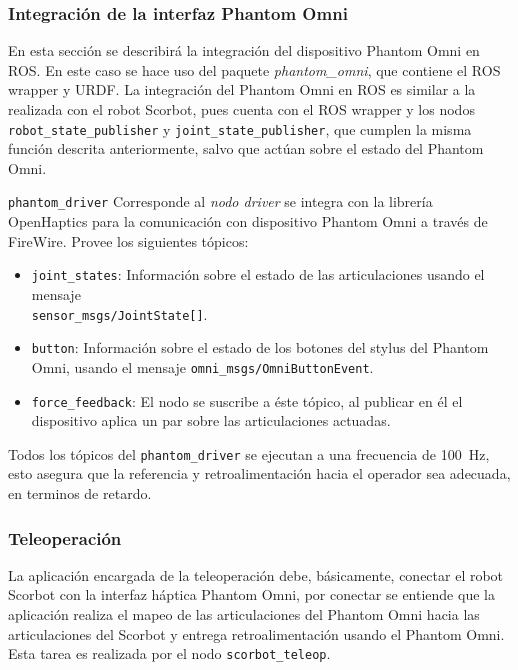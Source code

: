 \subsubsection{Integración de la interfaz Phantom Omni}

En esta sección se describirá la integración del dispositivo Phantom Omni en ROS. En este caso se hace uso del paquete \textit{phantom\_omni}\cite{phantom_git}, que contiene el ROS wrapper y URDF. La integración del Phantom Omni en ROS es similar a la realizada con el robot Scorbot, pues cuenta con el  ROS wrapper y los nodos \texttt{robot\_state\_publisher} y  \texttt{joint\_state\_publisher}, que cumplen la misma función descrita anteriormente, salvo que actúan sobre el estado del Phantom Omni.

\texttt{phantom\_driver} Corresponde al \textit{nodo driver} se integra con la librería OpenHaptics para la comunicación con dispositivo Phantom Omni a través de FireWire. Provee los siguientes tópicos:

\begin{itemize}
\item \texttt{joint\_states}: Información sobre el estado de las articulaciones usando el mensaje \\ \texttt{sensor\_msgs/JointState[]}.

\item \texttt{button}: Información sobre el estado de los botones del stylus del Phantom Omni, usando el mensaje \texttt{omni\_msgs/OmniButtonEvent}.

\item \texttt{force\_feedback}: El nodo se suscribe a éste tópico, al publicar en él el dispositivo aplica un par sobre las articulaciones actuadas.
\end{itemize}

Todos los tópicos del \texttt{phantom\_driver} se ejecutan a una frecuencia de \SI{100}{\hertz}, esto asegura que la referencia y retroalimentación hacia el operador sea adecuada, en terminos de retardo.


\subsubsection{Teleoperación}\label{cap4_teleoperacion}

La aplicación encargada de la teleoperación debe, básicamente, conectar el robot Scorbot con la interfaz háptica Phantom Omni, por conectar se entiende que la aplicación realiza el mapeo de las articulaciones del Phantom Omni hacia las articulaciones del Scorbot y entrega retroalimentación usando el Phantom Omni. Esta tarea es realizada por el nodo \texttt{scorbot\_teleop}.

